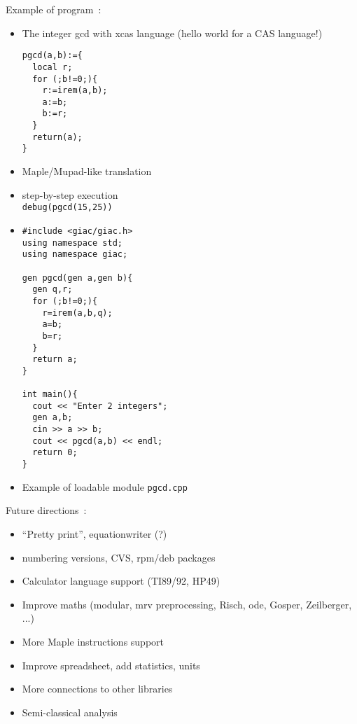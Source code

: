 \documentclass{slides}
\begin{document}
\pagebreak

Example of program~:
\begin{itemize}
\item The integer gcd with xcas language (hello world for a CAS
language!)
\begin{verbatim}
pgcd(a,b):={
  local r;
  for (;b!=0;){
    r:=irem(a,b);
    a:=b;
    b:=r;
  }
  return(a);
}
\end{verbatim}
\item Maple/Mupad-like translation
\item step-by-step execution\\
\verb|debug(pgcd(15,25))|
\item 
\begin{verbatim}
#include <giac/giac.h>
using namespace std;
using namespace giac;

gen pgcd(gen a,gen b){
  gen q,r;
  for (;b!=0;){
    r=irem(a,b,q);
    a=b;
    b=r;
  }
  return a;
}

int main(){
  cout << "Enter 2 integers";
  gen a,b;
  cin >> a >> b;
  cout << pgcd(a,b) << endl;
  return 0;
}
\end{verbatim}

\item Example of loadable module \verb|pgcd.cpp|
\end{itemize}

\pagebreak

Future directions~:
\begin{itemize}
\item ``Pretty print'', equationwriter (?)
\item numbering versions, CVS, rpm/deb packages
\item Calculator language support (TI89/92, HP49)
\item Improve maths (modular, mrv preprocessing, Risch, ode, Gosper, 
Zeilberger, ...)
\item More Maple instructions support
\item Improve spreadsheet, add statistics, units
\item More connections to other libraries
\item Semi-classical analysis
\end{itemize}
\end{document}
